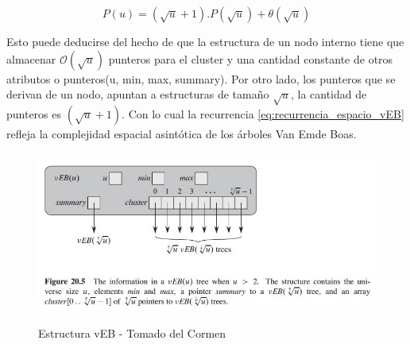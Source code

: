 \documentclass[10pt,a4paper]{article}
\begin{document}
\begin{equation}
    \label{eq:recurrencia_espacio_vEB}
    P(u) = (\sqrt{u} + 1).P(\sqrt{u}) + \theta( \sqrt{u} )
\end{equation}

Esto puede deducirse del hecho de que la estructura de un nodo interno tiene que almacenar $\mathcal{O}( \sqrt{u} ) $ punteros para el cluster y una cantidad constante de otros atributos o punteros(u, min, max, summary). Por otro lado, los punteros que se derivan de un nodo, apuntan a estructuras de tamaño $\sqrt{u}$, la cantidad de punteros es $(\sqrt{u} + 1)$. Con lo cual la recurrencia \ref{eq:recurrencia_espacio_vEB} refleja la complejidad espacial asintótica de los árboles Van Emde Boas.\\

\begin{figure}[H]
    \centering
    \includegraphics[scale=0.75]{fig/vBE-Struct.JPG}
    \label{fig:vBE-Struct}
    \caption{Estructura vEB - Tomado del Cormen}
\end{figure}
\end{document}

